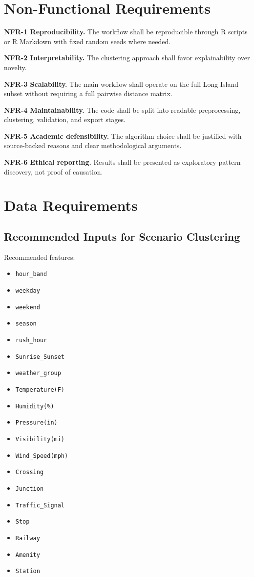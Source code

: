 \documentclass[11pt]{article}
\begin{document}
\section{Non-Functional Requirements}

\textbf{NFR-1 Reproducibility.} The workflow shall be reproducible through R scripts or R Markdown with fixed random seeds where needed.

\textbf{NFR-2 Interpretability.} The clustering approach shall favor explainability over novelty.

\textbf{NFR-3 Scalability.} The main workflow shall operate on the full Long Island subset without requiring a full pairwise distance matrix.

\textbf{NFR-4 Maintainability.} The code shall be split into readable preprocessing, clustering, validation, and export stages.

\textbf{NFR-5 Academic defensibility.} The algorithm choice shall be justified with source-backed reasons and clear methodological arguments.

\textbf{NFR-6 Ethical reporting.} Results shall be presented as exploratory pattern discovery, not proof of causation.

\section{Data Requirements}

\subsection{Recommended Inputs for Scenario Clustering}

Recommended features:

\begin{itemize}
\item \texttt{hour\_band}
\item \texttt{weekday}
\item \texttt{weekend}
\item \texttt{season}
\item \texttt{rush\_hour}
\item \texttt{Sunrise\_Sunset}
\item \texttt{weather\_group}
\item \texttt{Temperature(F)}
\item \texttt{Humidity(\%)}
\item \texttt{Pressure(in)}
\item \texttt{Visibility(mi)}
\item \texttt{Wind\_Speed(mph)}
\item \texttt{Crossing}
\item \texttt{Junction}
\item \texttt{Traffic\_Signal}
\item \texttt{Stop}
\item \texttt{Railway}
\item \texttt{Amenity}
\item \texttt{Station}
\end{itemize}
\end{document}
